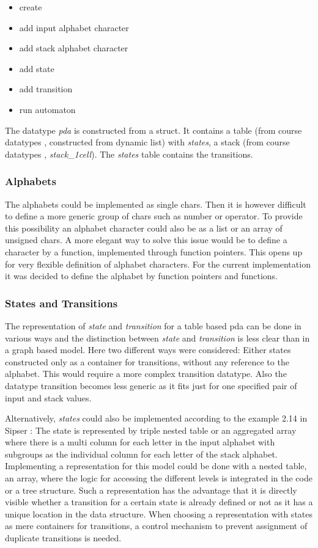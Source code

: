 \documentclass[a4paper,11pt,twoside]{article}
\begin{document}
\begin{itemize}
\item create
\item add input alphabet character
\item add stack alphabet character
\item add state
\item add transition
\item run automaton
\end{itemize}

The datatype \textit{pda} is constructed from a struct. It contains a
table (from course datatypes \cite{datatypes}, constructed from
dynamic list) with \textit{states}, a stack (from course datatypes
\cite{datatypes}, \textit{stack\_1cell}). The \textit{states} table contains
the transitions.

\subsubsection{Alphabets}
The alphabets could be implemented as single chars. Then it is however
difficult to define a more generic group of chars such as number or
operator. To provide this possibility an alphabet character could also
be as a list or an array of unsigned chars. A more elegant way to
solve this issue would be to define a character by a function,
implemented through function pointers. This opens up for very flexible
definition of alphabet characters. For the current implementation it
was decided to define the alphabet by function pointers and functions.  

\subsubsection{States and Transitions}
The representation of \textit{state} and \textit{transition} for
a table based pda can be done in various ways and the distinction
between \textit{state} and \textit{transition} is less clear than in a
graph based model. Here two different ways were considered: Either
states constructed only as a container for transitions, without any 
reference to the alphabet. This would require a more complex
transition datatype. Also the datatype transition becomes less generic
as it fits just for one specified pair of input and stack values.

Alternatively, \textit{states} could also be implemented according to
the example 2.14 in Sipser \cite[p. 114]{sipser2012}: The state is
represented by triple nested table or
an aggregated array where there is a multi column for each letter in
the input alphabet with subgroups as the individual column for each
letter of the stack alphabet. Implementing a representation for this
model could be done with a nested table, an array, where the logic for
accessing the different levels is integrated in the code or a tree
structure. Such a representation has the advantage that it is directly
visible whether a transition for a certain state is already defined or
not as it has a unique location in the data structure. When choosing a
representation with states as mere containers for transitions, a
control mechanism to prevent assignment of duplicate transitions is
needed. 
\end{document}
